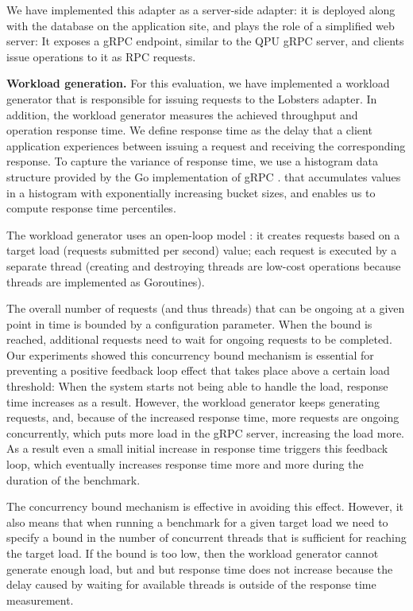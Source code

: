 We have implemented this adapter as a server-side adapter:
it is deployed along with the database on the application site, and plays the role of a simplified web server:
It exposes a gRPC endpoint, similar to the QPU gRPC server, and clients issue operations to it as RPC requests.

\bigskip
\noindent
\textbf{Workload generation.}
For this evaluation, we have implemented a workload generator \cite{lobsters:bench} that is responsible for issuing
requests to the Lobsters adapter.
In addition, the workload generator measures the achieved throughput and operation response time.
We define response time as the delay that a client application experiences between issuing a request and receiving the
corresponding response.
To capture the variance of response time, we use a histogram data structure provided by the Go implementation of gRPC \cite{grpcgo:histogram}.
that accumulates values in a histogram with exponentially increasing bucket sizes, and enables us to compute response time percentiles.

The workload generator uses an open-loop model \cite{schroeder:cautionarytale}:
it creates requests based on a target load (requests submitted per second) value;
each request is executed by a separate thread (creating and destroying threads are low-cost operations because threads are
implemented as Goroutines).

The overall number of requests (and thus threads) that can be ongoing at a given point in time is bounded by a
configuration parameter.
When the bound is reached, additional requests need to wait for ongoing requests to be completed.
Our experiments showed this concurrency bound mechanism is essential for preventing a positive feedback loop effect
that takes place above a certain load threshold:
When the system starts not being able to handle the load, response time increases as a result.
However, the workload generator keeps generating requests, and, because of the increased response time,
more requests are ongoing concurrently, which puts more load in the gRPC server, increasing the load more.
As a result even a small initial increase in response time triggers this feedback loop,
which eventually increases response time more and more during the duration of the benchmark.

The concurrency bound mechanism is effective in avoiding this effect.
However, it also means that when running a benchmark for a given target load we need to specify a bound in the number of
concurrent threads that is sufficient for reaching the target load.
If the bound is too low, then the workload generator cannot generate enough load, but and but response time does not
increase because the delay caused by waiting for available threads is outside of the response time measurement.

